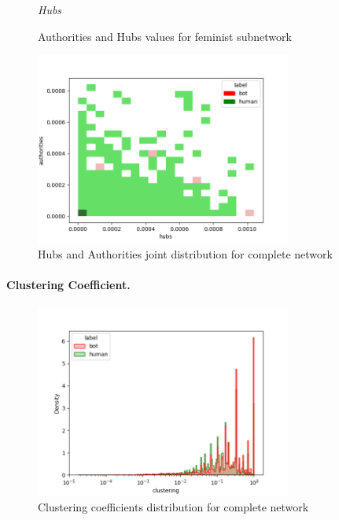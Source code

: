 \documentclass[12pt, a4paper]{article}
\begin{document}
\begin{itemize}
\begin{figure}[H]
\begin{minipage}[b]{0.49\textwidth}
        				\centering
        				\setlength{\fboxsep}{0pt}
    					\setlength{\fboxrule}{0.5pt}
        				\small\textit{\small Hubs}
    				\end{minipage}
    				\caption{Authorities and Hubs values for feminist subnetwork}
				\end{figure}
                \begin{figure}[H]
                    \centering
                    \includegraphics[width=0.75\textwidth]{results/complete_hubs&authorities.png}
                    \caption{Hubs and Authorities joint distribution for complete network}
                \end{figure}
		\end{itemize}
		\newpage
		\paragraph{Clustering Coefficient.}
		\mbox{}
        \begin{figure}[H]
            \centering
            \includegraphics[width=0.75\textwidth]{results/complete_clustering.png}
            \caption{Clustering coefficients distribution for complete network}
        \end{figure}
\end{document}
